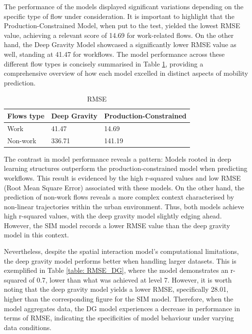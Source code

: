     The performance of the models displayed significant variations depending on the specific type of flow under consideration. It is important to highlight that the Production-Constrained Model, when put to the test, yielded the lowest RMSE value, achieving a relevant score of 14.69 for work-related flows. On the other hand, the Deep Gravity Model showcased a significantly lower RMSE value as well, standing at 41.47 for workflows. The model performance across these different flow types is concisely summarised in Table \ref{table: RMSE}, providing a comprehensive overview of how each model excelled in distinct aspects of mobility prediction.

            \begin{table}[h]
        \centering
        \begin{tabular}{@{}lll@{}}
        \toprule
        \textbf{Flows type} & \textbf{Deep Gravity} & \textbf{Production-Constrained} \\ \midrule
        Work                & 41.47                & 14.69                          \\
        Non-work            & 336.71                 & 141.19                          \\ \bottomrule
        \end{tabular}
            \caption{RMSE}
            \label{table: RMSE}
        \end{table}
    
    The contrast in model performance reveals a pattern: Models rooted in deep learning structures outperform the production-constrained model when predicting workflows. This result is evidenced by the high r-squared values and low RMSE (Root Mean Square Error) associated with these models. On the other hand, the prediction of non-work flows reveals a more complex context characterised by non-linear trajectories within the urban environment. Thus, both models achieve high r-squared values, with the deep gravity model slightly edging ahead. However, the SIM model records a lower RMSE value than the deep gravity model in this context.

    Nevertheless,  despite the spatial interaction model's computational limitations, the deep gravity model performs better when handling larger datasets. This is exemplified in Table \ref{table: RMSE_DG}, where the model demonstrates an r-squared of 0.7, lower than what was achieved at level 7. However, it is worth noting that the deep gravity model yields a lower RMSE, specifically 28.01, higher than the corresponding figure for the SIM model. Therefore, when the model aggregates data, the DG model experiences a decrease in performance in terms of RMSE, indicating the specificities of model behaviour under varying data conditions.
        
